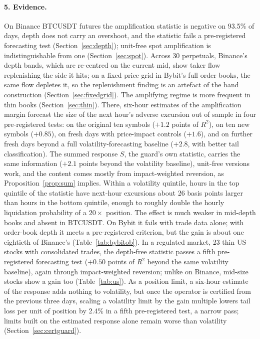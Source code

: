 \documentclass[12pt]{article}
\theoremstyle{definition}
\theoremstyle{remark}
\begin{document}
\paragraph{5. Evidence.} On Binance BTCUSDT futures the amplification statistic is negative on 93.5\% of days, depth does not carry an overshoot, and the statistic fails a pre-registered forecasting test (Section~\ref{sec:depth}); unit-free spot amplification is indistinguishable from one (Section~\ref{sec:spot}). Across 30 perpetuals, Binance's depth bands, which are re-centred on the current mid, show taker flow replenishing the side it hits; on a fixed price grid in Bybit's full order books, the same flow depletes it, so the replenishment finding is an artefact of the band construction (Section~\ref{sec:fixedgrid}). The amplifying regime is more frequent in thin books (Section~\ref{sec:thin}). There, six-hour estimates of the amplification margin forecast the size of the next hour's adverse excursion out of sample in four pre-registered tests: on the original ten symbols ($+1.2$ points of $R^2$), on ten new symbols ($+0.85$), on fresh days with price-impact controls ($+1.6$), and on further fresh days beyond a full volatility-forecasting baseline ($+2.8$, with better tail classification). The summed response $S$, the guard's own statistic, carries the same information ($+2.1$ points beyond the volatility baseline), unit-free versions work, and the content comes mostly from impact-weighted reversion, as Proposition~\ref{prop:sum} implies. Within a volatility quintile, hours in the top quintile of the statistic have next-hour excursions about 26 basis points larger than hours in the bottom quintile, enough to roughly double the hourly liquidation probability of a $20\times$ position. The effect is much weaker in mid-depth books and absent in BTCUSDT. On Bybit it fails with trade data alone; with order-book depth it meets a pre-registered criterion, but the gain is about one eightieth of Binance's (Table~\ref{tab:bybitob}). In a regulated market, 23 thin US stocks with consolidated trades, the depth-free statistic passes a fifth pre-registered forecasting test ($+0.50$ points of $R^2$ beyond the same volatility baseline), again through impact-weighted reversion; unlike on Binance, mid-size stocks show a gain too (Table~\ref{tab:us}). As a position limit, a six-hour estimate of the response adds nothing to volatility, but once the operator is certified from the previous three days, scaling a volatility limit by the gain multiple lowers tail loss per unit of position by 2.4\% in a fifth pre-registered test, a narrow pass; limits built on the estimated response alone remain worse than volatility (Section~\ref{sec:certguard}).
\end{document}

